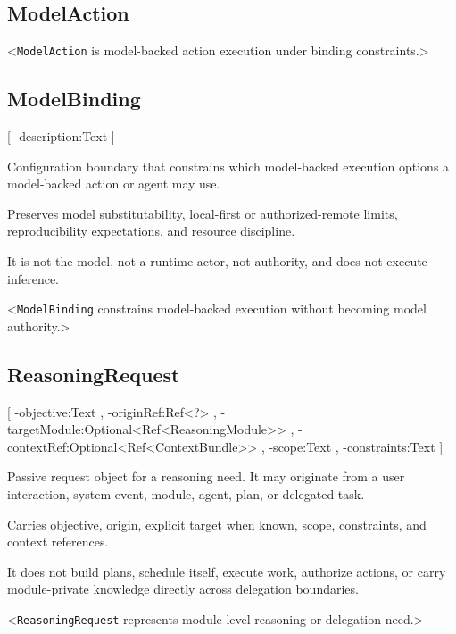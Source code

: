 \subsection{ModelAction}
<\texttt{ModelAction} is model-backed action execution under binding constraints.>

\subsection{ModelBinding}
[
	\UMLAt-description:Text
]{%
	\item[] Configuration boundary that constrains which model-backed execution options a model-backed action or agent may use.
	\item[] Preserves model substitutability, local-first or authorized-remote limits, reproducibility expectations, and resource discipline.
	\item[] It is not the model, not a runtime actor, not authority, and does not execute inference.
}<\texttt{ModelBinding} constrains model-backed execution without becoming model authority.>

\subsection{ReasoningRequest}
[
	\UMLAt-objective:Text ,
	\UMLAt-originRef:Ref<?> ,
	\UMLAt-targetModule:Optional<Ref<ReasoningModule>> ,
	\UMLAt-contextRef:Optional<Ref<ContextBundle>> ,
	\UMLAt-scope:Text ,
	\UMLAt-constraints:Text
]{%
	\item[] Passive request object for a reasoning need. It may originate from a user interaction, system event, module, agent, plan, or delegated task.
	\item[] Carries objective, origin, explicit target when known, scope, constraints, and context references.
	\item[] It does not build plans, schedule itself, execute work, authorize actions, or carry module-private knowledge directly across delegation boundaries.
}<\texttt{ReasoningRequest} represents module-level reasoning or delegation need.>

